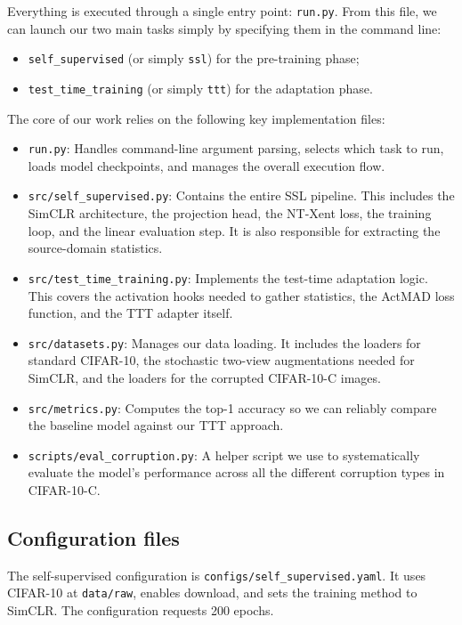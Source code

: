 \documentclass[a4paper,11pt]{article}
\begin{document}
Everything is executed through a single entry point: \texttt{run.py}. From this file, we can launch our two main tasks simply by specifying them in the command line:
\begin{itemize}[leftmargin=1.4em]
    \item \texttt{self\_supervised} (or simply \texttt{ssl}) for the pre-training phase;
    \item \texttt{test\_time\_training} (or simply \texttt{ttt}) for the adaptation phase.
\end{itemize}

The core of our work relies on the following key implementation files:
\begin{itemize}[leftmargin=1.4em]
    \item \texttt{run.py}: Handles command-line argument parsing, selects which task to run, loads model checkpoints, and manages the overall execution flow.
    \item \texttt{src/self\_supervised.py}: Contains the entire SSL pipeline. This includes the SimCLR architecture, the projection head, the NT-Xent loss, the training loop, and the linear evaluation step. It is also responsible for extracting the source-domain statistics.
    \item \texttt{src/test\_time\_training.py}: Implements the test-time adaptation logic. This covers the activation hooks needed to gather statistics, the ActMAD loss function, and the TTT adapter itself.
    \item \texttt{src/datasets.py}: Manages our data loading. It includes the loaders for standard CIFAR-10, the stochastic two-view augmentations needed for SimCLR, and the loaders for the corrupted CIFAR-10-C images.
    \item \texttt{src/metrics.py}: Computes the top-1 accuracy so we can reliably compare the baseline model against our TTT approach.
    \item \texttt{scripts/eval\_corruption.py}: A helper script we use to systematically evaluate the model's performance across all the different corruption types in CIFAR-10-C.
\end{itemize}

\subsection{Configuration files}

The self-supervised configuration is \texttt{configs/self\_supervised.yaml}. It uses CIFAR-10 at \texttt{data/raw}, enables download, and sets the training method to SimCLR. The configuration requests 200 epochs. 
\end{document}
